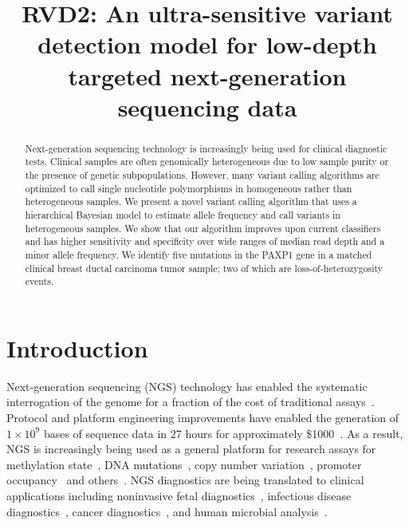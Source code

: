 \documentclass[11pt,reqno]{amsart}
\title[RVD2]{RVD2: An ultra-sensitive variant detection model for low-depth targeted next-generation sequencing data}
\author{}
\begin{document}
\begin{abstract}
Next-generation sequencing technology is increasingly being used for clinical diagnostic tests. Clinical samples are often genomically heterogeneous due to low sample purity or the presence of genetic subpopulations. However, many variant calling algorithms are optimized to call single nucleotide polymorphisms in homogeneous rather than heterogeneous samples. We present a novel variant calling algorithm that uses a hierarchical Bayesian model to estimate allele frequency and call variants in heterogeneous samples. We show that our algorithm improves upon current classifiers and has higher sensitivity and specificity over wide ranges of median read depth and a minor allele frequency. We identify five mutations in the PAXP1 gene in a matched clinical breast ductal carcinoma tumor sample; two of which are loss-of-heterozygosity events.

\end{abstract}

\maketitle

\section{Introduction}

Next-generation sequencing (NGS) technology has enabled the systematic interrogation of the genome for a fraction of the cost of traditional assays~\citep{Koboldt:2013kw}. Protocol and platform engineering improvements have enabled the generation of $1\times10^9$ bases of sequence data in 27 hours for approximately \$1000~\citep{Quail:2012hf}. As a result, NGS is increasingly being used as a general platform for research assays for methylation state~\citep{Laird:2010ab}, DNA mutations~\citep{Consortium:2013co}, copy number variation~\citep{Alkan:2009cr}, promoter occupancy~\citep{Ouyang:2009hc} and others~\citep{Rivera:2013ee}. NGS diagnostics are being translated to clinical applications including noninvasive fetal diagnostics~\citep{Kitzman:2012hea}, infectious disease diagnostics~\citep{Capobianchi:2012em}, cancer diagnostics~\citep{Navin:2010gu}, and human microbial analysis~\citep{Consortium:2013iz}. 
\end{document}
